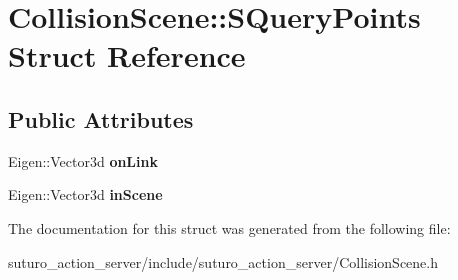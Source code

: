 \hypertarget{structCollisionScene_1_1SQueryPoints}{\section{Collision\-Scene\-:\-:S\-Query\-Points Struct Reference}
\label{structCollisionScene_1_1SQueryPoints}
}
\subsection*{Public Attributes}
\begin{DoxyCompactItemize}
\item 
\hypertarget{structCollisionScene_1_1SQueryPoints_ab1ea5365a8f6a1784b1ea3a954b4acb5}{Eigen\-::\-Vector3d {\bfseries on\-Link}}\label{structCollisionScene_1_1SQueryPoints_ab1ea5365a8f6a1784b1ea3a954b4acb5}

\item 
\hypertarget{structCollisionScene_1_1SQueryPoints_a2984d0e2f10e27354fdee9078de5f632}{Eigen\-::\-Vector3d {\bfseries in\-Scene}}\label{structCollisionScene_1_1SQueryPoints_a2984d0e2f10e27354fdee9078de5f632}

\end{DoxyCompactItemize}


The documentation for this struct was generated from the following file\-:\begin{DoxyCompactItemize}
\item 
suturo\-\_\-action\-\_\-server/include/suturo\-\_\-action\-\_\-server/Collision\-Scene.\-h\end{DoxyCompactItemize}
